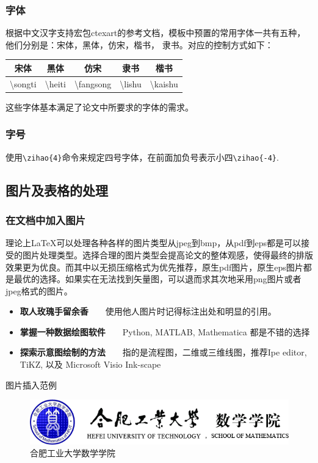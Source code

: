 \subsubsection{字体}
根据中文汉字支持宏包ctexart的参考文档，模板中预置的常用字体一共有五种，他们分别是：宋体，黑体，仿宋，楷书， 隶书。对应的控制方式如下：
\begin{center}
	\begin{tabular}{ccccc}
		\hline \rule[-2ex]{0pt}{5.5ex} { 宋体}               & { 黑体}               & { 仿宋}                 & { 隶书}              & {楷书}                \\
		\hline \rule[-2ex]{0pt}{5.5ex} \textbackslash songti & \textbackslash  heiti & \textbackslash fangsong & \textbackslash lishu & \textbackslash kaishu \\
		\hline
	\end{tabular}
\end{center}
这些字体基本满足了论文中所要求的字体的需求。


\subsubsection{字号}
使用\verb|\zihao{4}|命令来规定四号字体，在前面加负号表示小四\verb|\zihao{-4}|.
\subsection{图片及表格的处理}

\subsubsection{在文档中加入图片}
理论上\LaTeX 可以处理各种各样的图片类型从jpeg到bmp，从pdf到eps都是可以接受的图片处理类型。选择合理的图片类型会提高论文的整体观感，使得最终的排版效果更为优良。而其中以无损压缩格式为优先推荐，原生pdf图片，原生eps图片都是最优的选择。如果实在无法找到矢量图，可以退而求其次地采用png图片或者jpeg格式的图片。
\begin{itemize}
	\item \textbf{取人玫瑰手留余香}~~~~使用他人图片时记得标注出处和明显的引用。
	\item \textbf{掌握一种数据绘图软件}~~~~Python, MATLAB, Mathematica 都是不错的选择
	\item \textbf{探索示意图绘制的方法}~~~~指的是流程图，二维或三维线图，推荐Ipe editor, TiKZ, 以及 Microsoft Visio Ink-scape
\end{itemize}
图片插入范例
\begin{figure}[!htbp]
	\centering
	\includegraphics[width=0.75\linewidth]{figure/title}
	\caption{合肥工业大学数学学院}
	\label{fig:title}
\end{figure}

